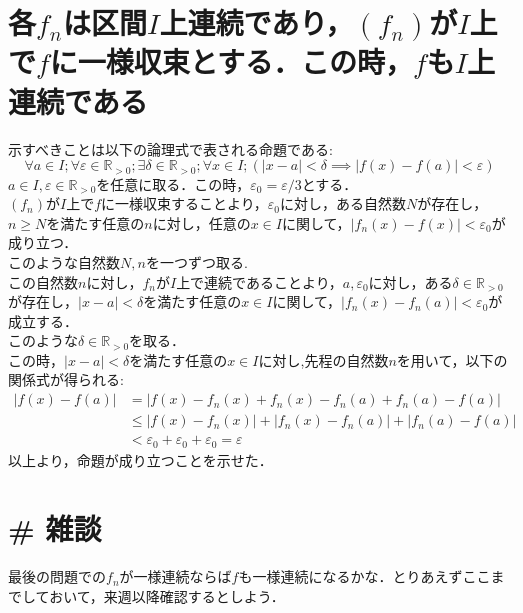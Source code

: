 \documentclass{jreport}
\begin{document}
\section{各$f_n$は区間$I$上連続であり，$(f_n)$が$I$上で$f$に一様収束とする．この時，$f$も$I$上連続である}
示すべきことは以下の論理式で表される命題である:
$$
 \forall a \in I; \forall \varepsilon \in \mathbb{R}_{>0}; \exists \delta \in \mathbb{R}_{>0}; \forall x  \in I;\left( |x-a|<\delta \implies |f(x) -f(a)| <\varepsilon \right)
$$
$a \in I , \varepsilon \in \mathbb{R}_{>0}$を任意に取る．この時，$\varepsilon_0 = \varepsilon /3$とする．\\
$(f_n)$が$I$上で$f$に一様収束することより，$\varepsilon_0 $に対し，ある自然数$N$が存在し，$n \ge N$を満たす任意の$n$に対し，任意の$x \in I$に関して，$| f_n(x) -f(x) |<\varepsilon_0$が成り立つ．\\
このような自然数$N,n$を一つずつ取る.\\
この自然数$n$に対し，$f_n$が$I$上で連続であることより，$a,\varepsilon_0$に対し，ある$\delta \in \mathbb{R}_{>0}$が存在し，$|x-a|<\delta$を満たす任意の$x \in I$に関して，$|f_n(x) - f_n(a)|<\varepsilon_0$が成立する．\\
このような$\delta \in \mathbb{R}_{>0}$を取る．\\
この時，$|x-a|<\delta$を満たす任意の$x \in I$に対し,先程の自然数$n$を用いて，以下の関係式が得られる:
\begin{equation}
	\begin{aligned}
		\left|f(x)-f(a)\right|&= \left|f(x)-f_n(x)+f_n(x)-f_n(a)+f_n(a)-f(a)\right| \\
				      &\le \left| f(x) - f_n(x) \right| + \left| f_n(x) - f_n(a) \right| +\left| f_n(a) -f(a) \right| \\
				      &<\varepsilon_0 +\varepsilon_0 +\varepsilon_0 =\varepsilon
	\end{aligned}
\end{equation}
以上より，命題が成り立つことを示せた．\\
\newpage
\section{\# 雑談}
最後の問題での$f_n$が一様連続ならば$f$も一様連続になるかな．とりあえずここまでしておいて，来週以降確認するとしよう．
\end{document}
